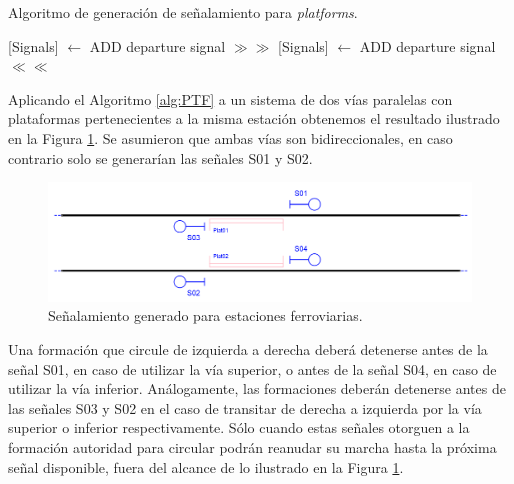     \begin{algorithm}[H]
        \caption{Algoritmo de generación de señalamiento para \textit{platforms}.}\label{alg:PTF}
        \DontPrintSemicolon
        \SetNoFillComment
        \LinesNotNumbered 
        {
            [Signals] $\gets$ ADD departure signal $\gg\gg$\;
            [Signals] $\gets$ ADD departure signal $\ll\ll$\;
        }
        \KwResult{[Signals]} 
    \end{algorithm}

    Aplicando el Algoritmo \ref{alg:PTF} a un sistema de dos vías paralelas con plataformas pertenecientes a la misma estación obtenemos el resultado ilustrado en la Figura \ref{fig:signal_platform}. Se asumieron que ambas vías son bidireccionales, en caso contrario solo se generarían las señales S01 y S02.
    
    \begin{figure}[H]
        \centering
        \includegraphics[width=1\textwidth]{Figuras/platforms.PNG}
        \centering\caption{Señalamiento generado para estaciones ferroviarias.}
        \label{fig:signal_platform}
    \end{figure}
    
    Una formación que circule de izquierda a derecha deberá detenerse antes de la señal S01, en caso de utilizar la vía superior, o antes de la señal S04, en caso de utilizar la vía inferior. Análogamente, las formaciones deberán detenerse antes de las señales S03 y S02 en el caso de transitar de derecha a izquierda por la vía superior o inferior respectivamente. Sólo cuando estas señales otorguen a la formación autoridad para circular podrán reanudar su marcha hasta la próxima señal disponible, fuera del alcance de lo ilustrado en la Figura \ref{fig:signal_platform}.
